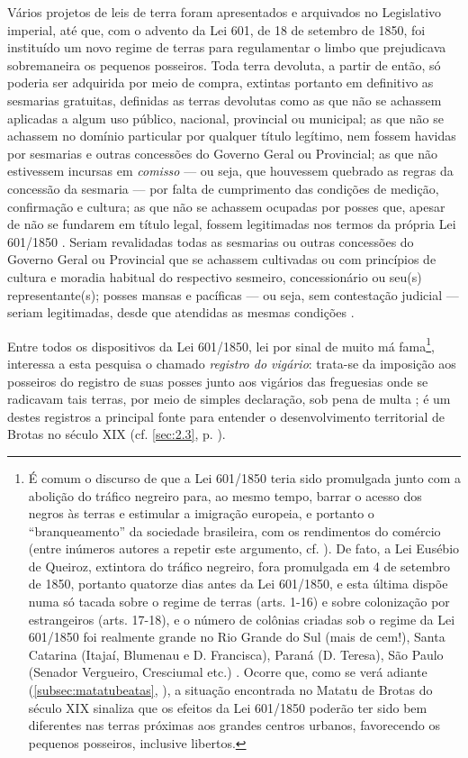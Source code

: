 Vários projetos de leis de terra foram apresentados e arquivados no Legislativo imperial, até que, com o advento da Lei 601, de 18 de setembro de 1850, foi instituído um novo regime de terras para regulamentar o limbo que prejudicava sobremaneira os pequenos posseiros. Toda terra devoluta, a partir de então, só poderia ser adquirida por meio de compra, extintas portanto em definitivo as sesmarias gratuitas, definidas as terras devolutas como as que não se achassem aplicadas a algum uso público, nacional, provincial ou municipal; as que não se achassem no domínio particular por qualquer título legítimo, nem fossem havidas por sesmarias e outras concessões do Governo Geral ou Provincial; as que não estivessem incursas em \textit{comisso} --- ou seja, que houvessem quebrado as regras da concessão da sesmaria --- por falta de cumprimento das condições de medição, confirmação e cultura; as que não se achassem ocupadas por posses que, apesar de não se fundarem em título legal, fossem legitimadas nos termos da própria Lei 601/1850 \cite[p.~53]{sodero_diragrario_1990}. Seriam revalidadas todas as sesmarias ou outras concessões do Governo Geral ou Provincial que se achassem cultivadas ou com princípios de cultura e moradia habitual do respectivo sesmeiro, concessionário ou seu(s) representante(s); posses mansas e pacíficas --- ou seja, sem contestação judicial --- seriam legitimadas, desde que atendidas as mesmas condições \cite[p.~54-55]{sodero_diragrario_1990}. 

Entre todos os dispositivos da Lei 601/1850, lei por sinal de muito má fama\footnote{É comum o discurso de que a Lei 601/1850 teria sido promulgada junto com a abolição do tráfico negreiro para, ao mesmo tempo, barrar o acesso dos negros às terras e estimular a imigração europeia, e portanto o ``branqueamento'' da sociedade brasileira, com os rendimentos do comércio (entre inúmeros autores a repetir este argumento, cf. ). De fato, a Lei Eusébio de Queiroz, extintora do tráfico negreiro, fora promulgada em 4 de setembro de 1850, portanto quatorze dias antes da Lei 601/1850, e esta última dispõe numa só tacada sobre o regime de terras (arts. 1-16) e sobre colonização por estrangeiros (arts. 17-18), e o número de colônias criadas sob o regime da Lei 601/1850 foi realmente grande no Rio Grande do Sul (mais de cem!), Santa Catarina (Itajaí, Blumenau e D. Francisca), Paraná (D. Teresa), São Paulo (Senador Vergueiro, Cresciumal etc.) \cite[p.~58]{sodero_diragrario_1990}. Ocorre que, como se verá adiante (\autoref{subsec:matatubeatas}, \pageref{subsec:matatubeatas}), a situação encontrada no Matatu de Brotas do século XIX sinaliza que os efeitos da Lei 601/1850 poderão ter sido bem diferentes nas terras próximas aos grandes centros urbanos, favorecendo os pequenos posseiros, inclusive libertos.}, interessa a esta pesquisa o chamado \textit{registro do vigário}: trata-se da imposição aos posseiros do registro de suas posses junto aos vigários das freguesias onde se radicavam tais terras, por meio de simples declaração, sob pena de multa \cite[pp.~55-56]{sodero_diragrario_1990}; é um destes registros a principal fonte para entender o desenvolvimento territorial de Brotas no século XIX (cf. \autoref{sec:2.3}, p. \pageref{sec:2.3}). 

